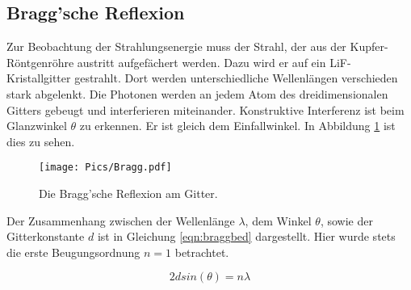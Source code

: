 \subsection{Bragg'sche Reflexion}

Zur Beobachtung der Strahlungsenergie muss der Strahl, der aus der Kupfer-Röntgenröhre
austritt aufgefächert werden. Dazu wird er auf ein LiF-Kristallgitter gestrahlt. Dort
werden unterschiedliche Wellenlängen verschieden stark abgelenkt. Die Photonen werden
an jedem Atom des dreidimensionalen Gitters gebeugt und interferieren miteinander.
Konstruktive Interferenz ist beim Glanzwinkel $\theta$ zu erkennen. Er ist gleich
dem Einfallwinkel. In Abbildung \ref{fig:bragg} ist dies zu sehen.

\begin{figure}
  \centering
  \texttt{[image: Pics/Bragg.pdf]}
  \caption{Die Bragg'sche Reflexion am Gitter. \cite{anleitung}}
  \label{fig:bragg}
\end{figure}

Der Zusammenhang zwischen der Wellenlänge $\lambda$, dem Winkel $\theta$, sowie der
Gitterkonstante $d$ ist in Gleichung \eqref{eqn:braggbed} dargestellt. Hier wurde
stets die erste Beugungsordnung $n=1$ betrachtet.

\begin{equation}
  2 d sin(\theta) = n \lambda
  \label{eqn:braggbed}
\end{equation}

\cite{anleitung}
